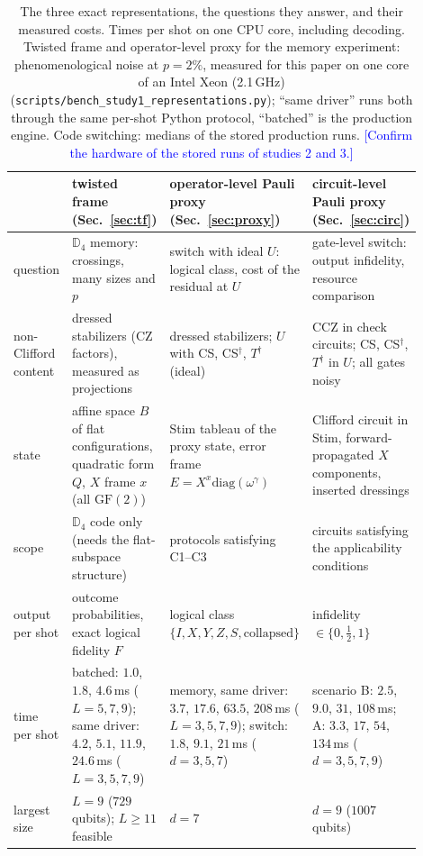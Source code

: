 \documentclass[a4paper]{article}
\newcommand{\blue}[1]{\textcolor{blue}{#1}}
\newcommand{\GF}{\mathrm{GF}(2)}
\begin{document}
\begin{table}[t]
\centering
\caption{The three exact representations, the questions they answer, and their measured costs. Times per shot on one CPU core, including decoding. Twisted frame and operator-level proxy for the memory experiment: phenomenological noise at $p=2\%$, measured for this paper on one core of an Intel Xeon (2.1\,GHz) (\texttt{scripts/bench\_study1\_representations.py}); ``same driver'' runs both through the same per-shot Python protocol, ``batched'' is the production engine. Code switching: medians of the stored production runs. \blue{[Confirm the hardware of the stored runs of studies 2 and 3.]}}
\label{tab:methods}
\small
\renewcommand{\arraystretch}{1.15}
\begin{tabular}{p{0.15\linewidth}p{0.25\linewidth}p{0.25\linewidth}p{0.25\linewidth}}
\toprule
 & twisted frame (Sec.~\ref{sec:tf}) & operator-level Pauli proxy (Sec.~\ref{sec:proxy}) & circuit-level Pauli proxy (Sec.~\ref{sec:circ}) \\
\midrule
question & $\mathbb{D}_4$ memory: crossings, many sizes and $p$ & switch with ideal $U$: logical class, cost of the residual at $U$ & gate-level switch: output infidelity, resource comparison \\
non-Clifford content & dressed stabilizers (CZ factors), measured as projections & dressed stabilizers; $U$ with CS, CS$^\dagger$, $T^\dagger$ (ideal) & CCZ in check circuits; CS, CS$^\dagger$, $T^\dagger$ in $U$; all gates noisy \\
state & affine space $B$ of flat configurations, quadratic form $Q$, $X$ frame $x$ (all $\GF$) & Stim tableau of the proxy state, error frame $E=X^x\mathrm{diag}(\omega^\gamma)$ & Clifford circuit in Stim, forward-propagated $X$ components, inserted dressings \\
scope & $\mathbb{D}_4$ code only (needs the flat-subspace structure) & protocols satisfying C1--C3 & circuits satisfying the applicability conditions \\
output per shot & outcome probabilities, exact logical fidelity $F$ & logical class $\{I,X,Y,Z,S,\text{collapsed}\}$ & infidelity $\in\{0,\tfrac12,1\}$ \\
time per shot & batched: $1.0$, $1.8$, $4.6$\,ms ($L=5,7,9$); same driver: $4.2$, $5.1$, $11.9$, $24.6$\,ms ($L=3,5,7,9$) & memory, same driver: $3.7$, $17.6$, $63.5$, $208$\,ms ($L=3,5,7,9$); switch: $1.8$, $9.1$, $21$\,ms ($d=3,5,7$) & scenario B: $2.5$, $9.0$, $31$, $108$\,ms; A: $3.3$, $17$, $54$, $134$\,ms ($d=3,5,7,9$) \\
largest size & $L=9$ ($729$ qubits); $L\ge11$ feasible & $d=7$ & $d=9$ ($1007$ qubits) \\
\bottomrule
\end{tabular}
\end{table}
\end{document}
